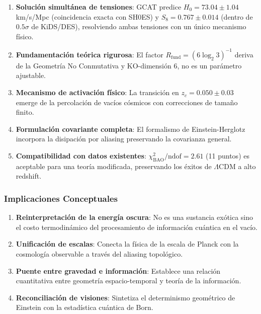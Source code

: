 \documentclass[12pt, a4paper]{article}
\theoremstyle{plain}
\theoremstyle{definition}
\begin{document}
\begin{enumerate}
    \item \textbf{Solución simultánea de tensiones}: GCAT predice $H_0 = 73.04 \pm 1.04$ km/s/Mpc (coincidencia exacta con SH0ES) y $S_8 = 0.767 \pm 0.014$ (dentro de $0.5\sigma$ de KiDS/DES), resolviendo ambas tensiones con un único mecanismo físico.
    
    \item \textbf{Fundamentación teórica rigurosa}: El factor $R_{\mathrm{fund}} = (6\log_2 3)^{-1}$ deriva de la Geometría No Conmutativa y KO-dimensión 6, no es un parámetro ajustable.
    
    \item \textbf{Mecanismo de activación físico}: La transición en $z_c = 0.050 \pm 0.03$ emerge de la percolación de vacíos cósmicos con correcciones de tamaño finito.
    
    \item \textbf{Formulación covariante completa}: El formalismo de Einstein-Herglotz incorpora la disipación por aliasing preservando la covarianza general.
    
    \item \textbf{Compatibilidad con datos existentes}: $\chi^2_{\mathrm{BAO}}/\mathrm{ndof} = 2.61$ (11 puntos) es aceptable para una teoría modificada, preservando los éxitos de $\Lambda$CDM a alto redshift.
\end{enumerate}

\subsubsection{Implicaciones Conceptuales}

\begin{enumerate}
    \item \textbf{Reinterpretación de la energía oscura}: No es una sustancia exótica sino el costo termodinámico del procesamiento de información cuántica en el vacío.
    
    \item \textbf{Unificación de escalas}: Conecta la física de la escala de Planck con la cosmología observable a través del aliasing topológico.
    
    \item \textbf{Puente entre gravedad e información}: Establece una relación cuantitativa entre geometría espacio-temporal y teoría de la información.
    
    \item \textbf{Reconciliación de visiones}: Sintetiza el determinismo geométrico de Einstein con la estadística cuántica de Born.
\end{enumerate}
\end{document}
